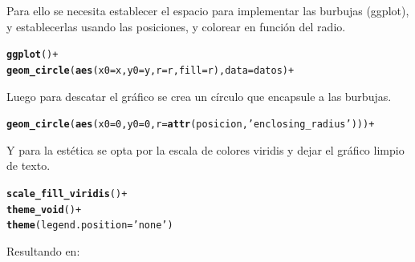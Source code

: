\documentclass{article}\usepackage[]{graphicx}\usepackage[]{color}
\makeatletter
\newcommand{\hlstr}[1]{\textcolor[rgb]{0.192,0.494,0.8}{#1}}%
\newcommand{\hlopt}[1]{\textcolor[rgb]{0,0,0}{#1}}%
\newcommand{\hlstd}[1]{\textcolor[rgb]{0.345,0.345,0.345}{#1}}%
\newcommand{\hlkwc}[1]{\textcolor[rgb]{0.333,0.667,0.333}{#1}}%
\newcommand{\hlkwd}[1]{\textcolor[rgb]{0.737,0.353,0.396}{\textbf{#1}}}%
\newenvironment{kframe}{%
 \def\at@end@of@kframe{}%
 \ifinner\ifhmode%
  \def\at@end@of@kframe{\end{minipage}}%
  \begin{minipage}{\columnwidth}%
 \fi\fi%
 \def\FrameCommand##1{\hskip\@totalleftmargin \hskip-\fboxsep
 \colorbox{shadecolor}{##1}\hskip-\fboxsep
     \hskip-\linewidth \hskip-\@totalleftmargin \hskip\columnwidth}%
 \MakeFramed {\advance\hsize-\width
   \@totalleftmargin\z@ \linewidth\hsize
   \@setminipage}}%
 {\par\unskip\endMakeFramed%
 \at@end@of@kframe}
\newenvironment{knitrout}{}{} %
\makeatother
\begin{document}
Para ello se necesita establecer el espacio para implementar las burbujas (ggplot), y establecerlas usando las posiciones, y colorear en funci\'on del radio.
\begin{knitrout}
\color{fgcolor}\begin{kframe}
\begin{alltt}
\hlkwd{ggplot}() +
  \hlkwd{geom_circle}(\hlkwd{aes}(x0 = x, y0 = y, r = r, fill = r), data = datos) +
\end{alltt}
\end{kframe}
\end{knitrout}
Luego para descatar el gr\'afico se crea un c\'irculo que encapsule a las burbujas.
\begin{knitrout}
\color{fgcolor}\begin{kframe}
\begin{alltt}
  \hlkwd{geom_circle}(\hlkwd{aes}(x0 = 0, y0 = 0, r = \hlkwd{attr}(posicion, \hlstr{'enclosing_radius'}))) +
\end{alltt}
\end{kframe}
\end{knitrout}
Y para la est\'etica se opta por la escala de colores viridis y dejar el gr\'afico limpio de texto.
\begin{knitrout}
\color{fgcolor}\begin{kframe}
\begin{alltt}
  \hlkwd{scale_fill_viridis}\hlstd{()} \hlopt{+}
  \hlkwd{theme_void}\hlstd{()} \hlopt{+}
  \hlkwd{theme}\hlstd{(}\hlkwc{legend.position} \hlstd{=} \hlstr{'none'}\hlstd{)}
\end{alltt}
\end{kframe}
\end{knitrout}
\clearpage
Resultando en: 
\end{document}
